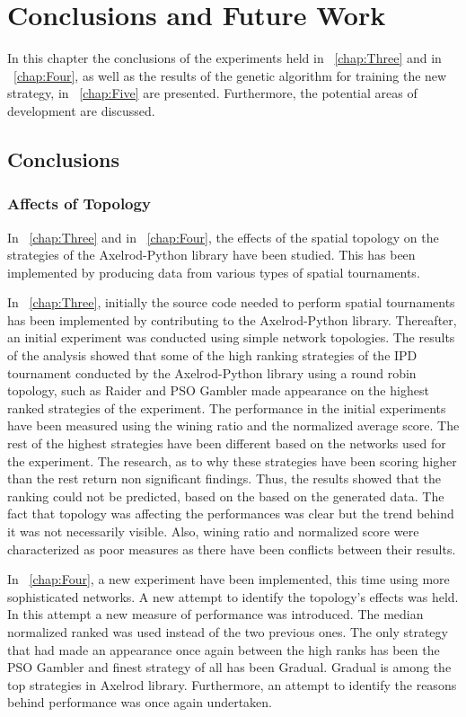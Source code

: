 \chapter{Conclusions and Future Work}
\label{chap:Six}

In this chapter the conclusions of the experiments held in
~\autoref{chap:Three} and in ~\autoref{chap:Four}, as well as the results
of the genetic algorithm for training the new strategy, in ~\autoref{chap:Five}
are presented. Furthermore, the potential areas of development are discussed.

\section{Conclusions}
\subsection{Affects of Topology}

In ~\autoref{chap:Three} and in ~\autoref{chap:Four}, the effects of the spatial
topology on the strategies of the Axelrod-Python library have been studied. This
has been implemented by producing data from various types of spatial tournaments.

In ~\autoref{chap:Three}, initially the source code needed to perform spatial tournaments
has been implemented by contributing to the Axelrod-Python library. Thereafter,
an initial experiment was conducted using simple network topologies.
The results of the analysis showed that some of the high ranking strategies
of the IPD tournament conducted by the Axelrod-Python library using a round robin
topology, such as Raider and PSO Gambler made appearance on the highest ranked
strategies of the experiment. The performance in the initial experiments have been
measured using the wining ratio and the normalized average score. The rest of
the highest strategies have been different based on the networks used for the
experiment. The research, as to why these strategies have been scoring higher than
the rest return non significant findings. Thus, the results showed that the ranking
could not be predicted, based on the based on the generated data. The fact that topology
was affecting the performances was clear but the trend behind it was not necessarily
visible. Also, wining ratio and normalized score were characterized as poor measures
as there have been conflicts between their results.

In ~\autoref{chap:Four}, a new experiment have been implemented, this time using
more sophisticated networks. A new attempt to identify the topology's effects
was held. In this attempt a new measure of performance was introduced. The median
normalized ranked was used instead of the two previous ones. The only strategy that had
made an appearance once again between the high ranks has been the PSO Gambler and
finest strategy of all has been Gradual. Gradual is among the top strategies in
Axelrod library. Furthermore, an attempt to identify the reasons behind performance
was once again undertaken.

